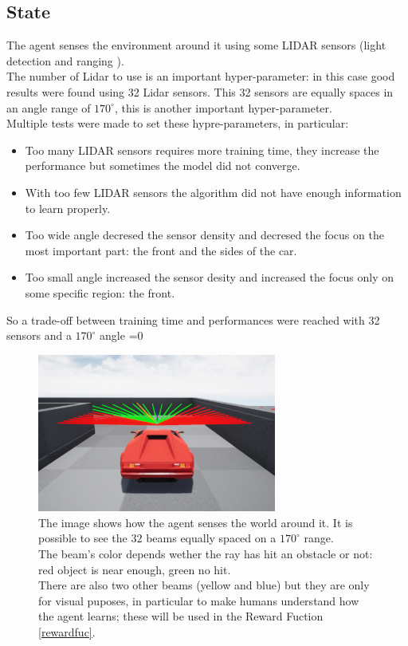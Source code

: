 \documentclass[14pt]{extarticle}
\def\sp{\vspace{5pt}}
\newcounter{debug}
\begin{document}
\begin{flushleft}
	\subsection{State}
	\sp
	The agent senses the environment around it using some LIDAR sensors (light detection and ranging \cite{Lidar}). \\
	The number of Lidar to use is an important hyper-parameter: in this case good results were found using 32 Lidar sensors. This 32 sensors are equally spaces in an angle range of $170^{\circ}$, this is another important hyper-parameter. \\
	Multiple tests were made to set these hypre-parameters, in particular:
	\begin{itemize}
	\item Too many LIDAR sensors requires more training time, they increase the performance but sometimes the model did not converge.
	\item With too few LIDAR sensors the algorithm did not have enough information to learn properly.
	\item Too wide angle decresed the sensor density and decresed the focus on the most important part: the front and the sides of the car.
	\item Too small angle increased the sensor desity and increased the focus only on some specific region: the front.
	\end{itemize}
	So a trade-off between training time and performances were reached with 32 sensors and a $170^{\circ}$ angle
	\ifnum\value{debug}=0 {
	\begin{figure}[H] \label{carState}
    		\centering\includegraphics[width=0.7\textwidth]{./Image/State/carSensors.png}
		\vspace{5mm}
		\caption{The image shows how the agent senses the world around it. It is possible to see the $32$ beams equally spaced on a $170^{\circ}$ range. \\
		The beam's color depends wether the ray has hit an obstacle or not: red object is near enough, green no hit. \\
		There are also two other beams (yellow and blue) but they are only for visual puposes, in particular to make humans understand how the agent learns; these will be used in the Reward Fuction \ref{rewardfuc}.}
	\end{figure}
	}\fi
	

\end{flushleft}
\end{document}
